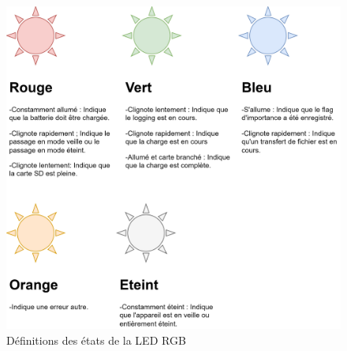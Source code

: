 {{		\begin{figure}[h]
			\centering
			\includegraphics[width=0.95\linewidth]{Figures/Dev-SCH/LEDStates}
			\caption{Définitions des états de la LED RGB}
			\label{fig:ledstates}
		\end{figure}
	}

	\clearpage
}
